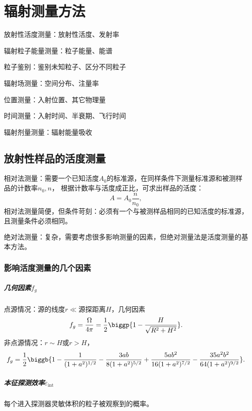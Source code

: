 \chapter{辐射测量方法}
\begin{compactitem}
	\item 放射性活度测量：放射性活度、发射率
	\item 辐射粒子能量测量：粒子能量、能谱
	\item 粒子鉴别：鉴别未知粒子、区分不同粒子
	\item 辐射场测量：空间分布、注量率
	\begin{compactitem}
		\item 位置测量：入射位置、其它物理量
		\item 时间测量：入射时间、半衰期、飞行时间
		\item 辐射剂量测量：辐射能量吸收
	\end{compactitem}
\end{compactitem}

\section{放射性样品的活度测量}

相对法测量：需要一个已知活度$A_0$的标准源，在同样条件下测量标准源和被测样品的计数率$n_0,n$， 根据计数率与活度成正比，可求出样品的活度：
\[
	A=A_0\frac n{n_0},
\]
相对法测量简便，但条件苛刻：必须有一个与被测样品相同的已知活度的标准源，且测量条件必须相同。

绝对法测量：复杂，需要考虑很多影响测量的因素，但绝对测量法是活度测量的基本方法。

\subsection{影响活度测量的几个因素}

\paragraph{几何因素$f_g$}
点源情况：源的线度$r\ll$源探距离$H$，几何因素
\[
	f_g=\frac\Omega{4\pi}=\frac12\biggp{1-\frac H{\sqrt{R^2+H^2}}}.
\]
非点源情况：$r\sim H$或$r>H$，
\[
	f_g=\frac12\biggb{1-\frac1{(1+a^2)^{1/2}}-\frac{3ab}{8(1+a^2)^{5/2}}+\frac{5ab^2}{16(1+a^2)^{7/2}}-\frac{35a^2b^2}{64(1+a^2)^{9/2}}}.
\]
\paragraph{本征探测效率$\varepsilon_{\mathrm{int}}$}
每个进入探测器灵敏体积的粒子被观察到的概率。

